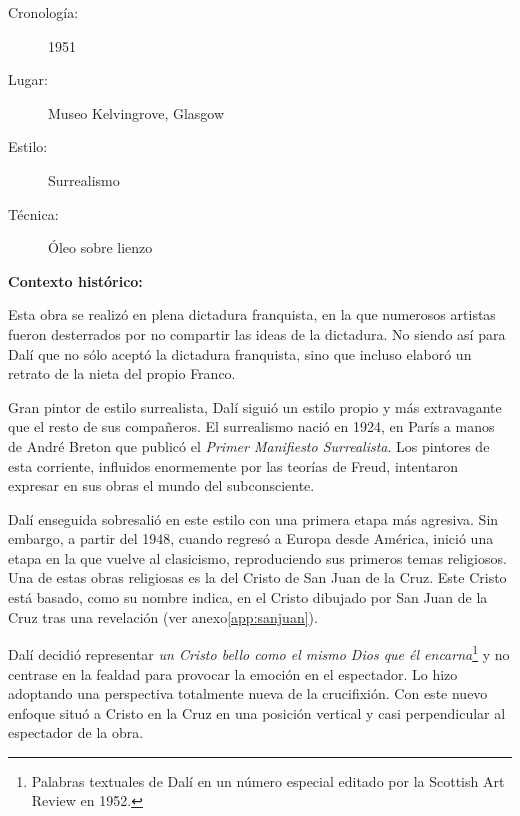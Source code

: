 
\begin{description}
\item[Cronología:] 1951
\item[Lugar:] Museo Kelvingrove, Glasgow
\item[Estilo:] Surrealismo
\item[Técnica:] Óleo sobre lienzo
\end{description}

\textbf{Contexto histórico:}

Esta obra se realizó en plena dictadura franquista, en la que numerosos artistas fueron desterrados por no compartir las ideas de la dictadura. No siendo así para Dalí que no sólo aceptó la dictadura franquista, sino que incluso elaboró un retrato de la nieta del propio Franco.

Gran pintor de estilo surrealista, Dalí siguió un estilo propio y más extravagante que el resto de sus compañeros. El surrealismo nació en 1924, en París a manos de André Breton que publicó el \textit{Primer Manifiesto Surrealista}. Los pintores de esta corriente, influidos enormemente por las teorías de Freud, intentaron expresar en sus obras el mundo del subconsciente.\cite{RefWorks:53}

Dalí enseguida sobresalió en este estilo con una primera etapa más agresiva. Sin embargo, a partir del 1948, cuando regresó a Europa desde América, inició una etapa en la que vuelve al clasicismo, reproduciendo sus primeros temas religiosos. Una de estas obras religiosas es la del Cristo de San Juan de la Cruz. Este Cristo está basado, como su nombre indica, en el Cristo dibujado por San Juan de la Cruz tras una revelación (ver anexo\autoref{app:sanjuan}).

Dalí decidió representar \textit{un Cristo bello como el mismo Dios que él encarna}\footnote{Palabras textuales de Dalí en un número especial editado por la Scottish Art Review en 1952.\cite{RefWorks:68}} y no centrase en la fealdad para provocar la emoción en el espectador. Lo hizo adoptando una perspectiva totalmente nueva de la crucifixión. Con este nuevo enfoque situó a Cristo en la Cruz en una posición vertical y casi perpendicular al espectador de la obra.

